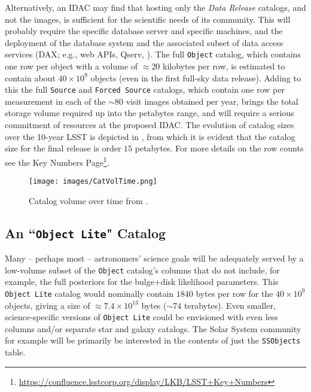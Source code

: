 Alternatively, an \gls{IDAC} may find that hosting only the {\it Data Release} catalogs, and not the images, is sufficient for the scientific needs of its community. This will probably require the specific \RO database server  and specific machines, and the deployment of the database system and the associated subset of data access services (\gls{DAX}; e.g., web APIs, \gls{Qserv}, ). The full {\tt Object} catalog, which contains one row per object with a volume of $\approx 20$ kilobytes per row, is estimated to contain about $40 \times 10^9$ objects (even in the first full-sky data release). Adding to this the full {\tt Source} and {\tt Forced Source} catalogs, which contain one row per measurement in each of the $\sim80$ visit images obtained per year, brings the total storage volume required up into the petabytes range, and will require a serious commitment of resources at the proposed \gls{IDAC}. The evolution of catalog sizes over the 10-year \gls{LSST} is depicted in , from which it is evident that the catalog size for the final release is order $15$ petabytes. For more details on the row counts see the Key Numbers Page\footnote{\url{https://confluence.lsstcorp.org/display/LKB/LSST+Key+Numbers}}.

\begin{figure}
\begin{center}
\texttt{[image: images/CatVolTime.png]}
\caption{Catalog volume over time from . \label{fig:catvol}}
\end{center}
\end{figure}

\subsection{An ``{\tt \gls{Object} Lite}" Catalog}\label{sec:lite}

Many -- perhaps most -- astronomers' science goals will be adequately served by a low-volume subset of the {\tt \gls{Object}} catalog's columns that do not include, for example, the full posteriors for the bulge+disk likelihood parameters.
This {\tt \gls{Object} Lite} catalog would nominally contain $1840$ bytes per row for the $40 \times 10^{9}$ objects, giving a size of $\approx 7.4 \times 10^{13}$ bytes ($\sim74$ terabytes).
Even smaller, science-specific versions of {\tt \gls{Object} Lite} could be envisioned with even less columns and/or separate star and galaxy catalogs.
The Solar System community for example will be primarily be interested in the contents of  just the  {\tt SSObjects} table.

